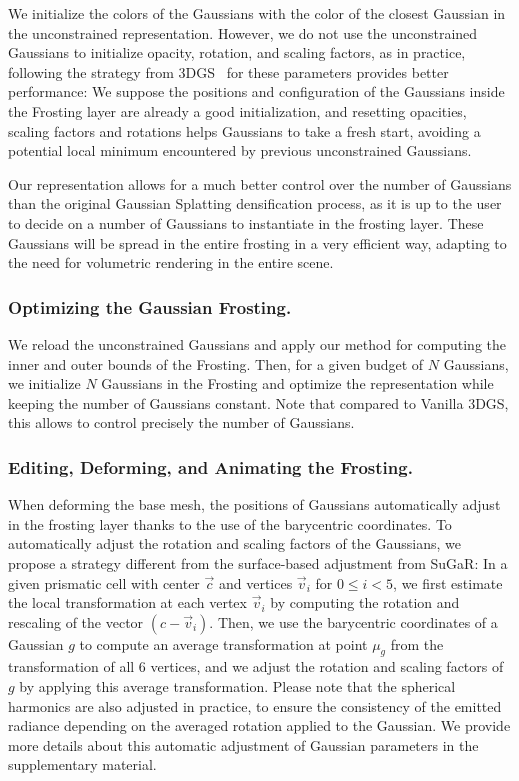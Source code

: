 We initialize the colors of the Gaussians with the color of the closest Gaussian in the unconstrained representation. However, we do not use the unconstrained Gaussians to initialize opacity, rotation, and scaling factors, as in practice, following the strategy from 3DGS~\cite{kerbl3Dgaussians} for these parameters provides better performance: 
We suppose the positions and configuration of the Gaussians inside the Frosting layer are already a good initialization, and resetting opacities, scaling factors and rotations helps Gaussians to take a fresh start, avoiding a potential local minimum encountered by previous unconstrained Gaussians.

Our representation allows for a much better control over the number of Gaussians than the original Gaussian Splatting densification process, as it is up to the user to decide on a number of Gaussians to instantiate in the frosting layer. These Gaussians will be spread in the entire frosting in a very efficient way, adapting to the need for volumetric rendering in the entire scene.

\subsubsection{Optimizing the Gaussian Frosting.} We reload the unconstrained Gaussians and apply our method for computing the inner and outer bounds of the Frosting. Then, for a given budget of $N$ Gaussians, we initialize $N$ Gaussians in the Frosting and optimize the representation while keeping the number of Gaussians constant. Note that compared to Vanilla 3DGS, this allows to control precisely the number of Gaussians.


\subsubsection{Editing, Deforming, and Animating the Frosting.} When deforming the base mesh, the positions of Gaussians automatically adjust in the frosting layer thanks to the use of the barycentric coordinates. 
%
To automatically adjust the rotation and scaling factors of the Gaussians, we propose a strategy different from the surface-based adjustment from SuGaR: In a given prismatic cell with center $\vec{c}$ and vertices $\vec{v}_i$ for $0\leq i<5$, we first estimate the local transformation at each vertex $\vec{v}_i$ by computing the rotation and rescaling of the vector $(c - \vec{v}_i)$. 
%
Then, we use the barycentric coordinates of a Gaussian $g$ to compute an average transformation at point $\mu_g$ from the transformation of all 6 vertices, and we adjust the rotation and scaling factors of $g$ by applying this average transformation. 
%
Please note that the spherical harmonics are also adjusted in practice, to ensure the consistency of the emitted radiance depending on the averaged rotation applied to the Gaussian.
%
We provide more details about this automatic adjustment of Gaussian parameters in the supplementary material.